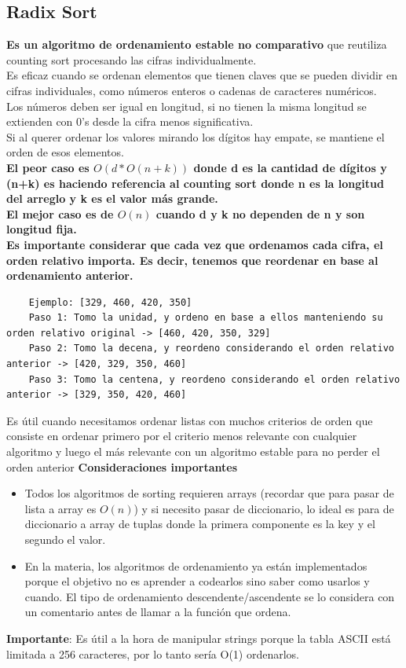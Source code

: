 \documentclass[10pt,a4paper]{article}
\begin{document}
\subsection*{Radix Sort}
\textbf{Es un algoritmo de ordenamiento estable no comparativo} que reutiliza counting sort procesando las cifras individualmente. \\ Es eficaz cuando se ordenan elementos que tienen claves que se pueden dividir en cifras individuales, como números enteros o cadenas de caracteres numéricos. \\
Los números deben ser igual en longitud, si no tienen la misma longitud se extienden con 0's desde la cifra menos significativa. \\
Si al querer ordenar los valores mirando los dígitos hay empate, se mantiene el orden de esos elementos. \\
\textbf{El peor caso es $O(d \ast O(n+k))$ donde d es la cantidad de dígitos y (n+k) es haciendo referencia al counting sort donde n es la longitud del arreglo y k es el valor más grande. \\
El mejor caso es de $O(n)$ cuando d y k no dependen de n y son longitud fija. \\}
\textbf{Es importante considerar que cada vez que ordenamos cada cifra, el orden relativo importa. Es decir, tenemos que reordenar en base al ordenamiento anterior.}
\begin{lstlisting}
    Ejemplo: [329, 460, 420, 350]
    Paso 1: Tomo la unidad, y ordeno en base a ellos manteniendo su orden relativo original -> [460, 420, 350, 329]
    Paso 2: Tomo la decena, y reordeno considerando el orden relativo anterior -> [420, 329, 350, 460]
    Paso 3: Tomo la centena, y reordeno considerando el orden relativo anterior -> [329, 350, 420, 460]
\end{lstlisting}
Es útil cuando necesitamos ordenar listas con muchos criterios de orden que consiste en ordenar primero por el criterio menos relevante con cualquier algoritmo y luego el más relevante con un algoritmo estable para no perder el orden anterior
\textbf{Consideraciones importantes}
\begin{itemize}
    \item Todos los algoritmos de sorting requieren arrays (recordar que para pasar de lista a array es $O(n)$) y si necesito pasar de diccionario, lo ideal es para de diccionario a array de tuplas donde la primera componente es la key y el segundo el valor.
    \item En la materia, los algoritmos de ordenamiento ya están implementados porque el objetivo no es aprender a codearlos sino saber como usarlos y cuando. El tipo de ordenamiento descendente/ascendente se lo considera con un comentario antes de llamar a la función que ordena. 
\end{itemize}
\textbf{Importante}: Es útil a la hora de manipular strings porque la tabla ASCII está limitada a 256 caracteres, por lo tanto sería O(1) ordenarlos.
\end{document}
